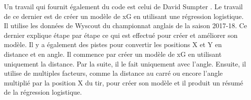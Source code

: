 \documentclass[12pt]{article}
\begin{document}
\newline\newline
Un travail qui fournit également du code est celui de David Sumpter \cite{sumpterFittingXGModel}. 
Le travail de ce dernier est de créer un modèle de xG en utilisant une régression logistique. 
Il utilise les données de Wyscout du championnat anglais de la saison 2017-18. 
Ce dernier explique étape par étape ce qui est effectué pour créer et améliorer son modèle.
Il y a également des pistes pour convertir les positions X et Y en distance et en angle.
Il commence par créer un modèle de xG en utilisant uniquement la distance. 
Par la suite, il le fait uniquement avec l'angle.
Ensuite, il utilise de multiples facteurs, comme la distance au carré ou encore l'angle multiplié par la position X du tir, pour créer son modèle et il produit un résumé de la régression logistique.
\end{document}
